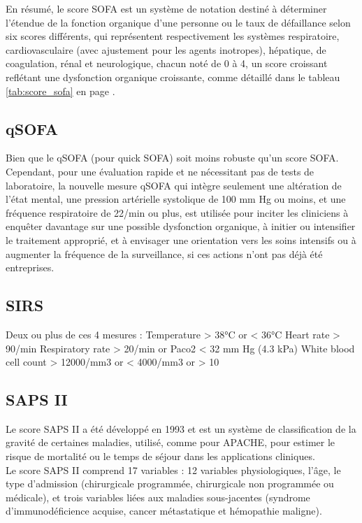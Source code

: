 \documentclass[a4paper,12pt]{article}
\begin{document}
En résumé, le score SOFA est un système de notation destiné à déterminer l'étendue de la fonction organique d'une personne ou le taux de défaillance selon six scores différents, qui représentent respectivement les systèmes respiratoire, cardiovasculaire (avec ajustement pour les agents inotropes), hépatique, de coagulation, rénal et neurologique, chacun noté de 0 à 4, un score croissant reflétant une dysfonction organique croissante, comme détaillé dans le tableau \ref{tab:score_sofa} en page \pageref{tab:score_sofa}.\\

\subsection{qSOFA \cite{singer2016third}}
Bien que le qSOFA (pour quick SOFA) soit moins robuste qu'un score SOFA. Cependant, pour une évaluation rapide et ne nécessitant pas de tests de laboratoire, la nouvelle mesure qSOFA qui intègre seulement une altération de l'état mental, une pression artérielle systolique de 100 mm Hg ou moins, et une fréquence respiratoire de 22/min ou plus, est utilisée pour inciter les cliniciens à enquêter davantage sur une possible dysfonction organique, à initier ou intensifier le traitement approprié, et à envisager une orientation vers les soins intensifs ou à augmenter la fréquence de la surveillance, si ces actions n'ont pas déjà été entreprises.\\ 

\subsection{SIRS \cite{bone1992definitions}}
Deux ou plus de ces 4 mesures : 
Temperature > 38°C or < 36°C
Heart rate > 90/min
Respiratory rate > 20/min or Paco2 < 32 mm Hg (4.3 kPa)
White blood cell count > 12000/mm3 or < 4000/mm3 or > 10 \\ %

\subsection{SAPS II \cite{le1993new}}
Le score SAPS II a été développé en 1993 \cite{le1993new} et est un système de classification de la gravité de certaines maladies, utilisé, comme pour APACHE, pour estimer le risque de mortalité ou le temps de séjour dans les applications cliniques.\\
Le score SAPS II comprend 17 variables : 12 variables physiologiques, l'âge, le type d'admission (chirurgicale programmée, chirurgicale non programmée ou médicale), et trois variables liées aux maladies sous-jacentes (syndrome d'immunodéficience acquise, cancer métastatique et hémopathie maligne).
\end{document}
